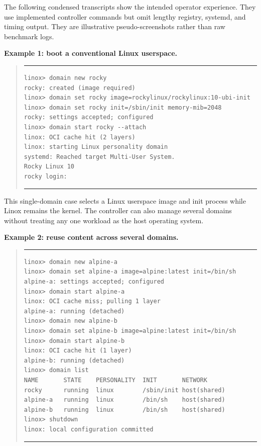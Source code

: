 \documentclass[11pt]{article}
\begin{document}
The following condensed transcripts show the intended operator experience.
They use implemented controller commands but omit lengthy registry, systemd,
and timing output. They are illustrative pseudo-screenshots rather than raw
benchmark logs.

\medskip
\begin{samepage}
\noindent\textbf{Example 1: boot a conventional Linux userspace.}\par\nopagebreak\smallskip
\begin{quote}\small\hrule\vspace{4pt}
\begin{verbatim}
linox> domain new rocky
rocky: created (image required)
linox> domain set rocky image=rockylinux/rockylinux:10-ubi-init
linox> domain set rocky init=/sbin/init memory-mib=2048
rocky: settings accepted; configured
linox> domain start rocky --attach
linox: OCI cache hit (2 layers)
linox: starting Linux personality domain
systemd: Reached target Multi-User System.
Rocky Linux 10
rocky login:
\end{verbatim}
\vspace{2pt}\hrule
\end{quote}
\end{samepage}
\medskip

This single-domain case selects a Linux userspace image and init process while
Linox remains the kernel. The controller can also manage several domains
without treating any one workload as the host operating system.

\medskip
\begin{samepage}
\noindent\textbf{Example 2: reuse content across several domains.}\par\nopagebreak\smallskip
\begin{quote}\small\hrule\vspace{4pt}
\begin{verbatim}
linox> domain new alpine-a
linox> domain set alpine-a image=alpine:latest init=/bin/sh
alpine-a: settings accepted; configured
linox> domain start alpine-a
linox: OCI cache miss; pulling 1 layer
alpine-a: running (detached)
linox> domain new alpine-b
linox> domain set alpine-b image=alpine:latest init=/bin/sh
linox> domain start alpine-b
linox: OCI cache hit (1 layer)
alpine-b: running (detached)
linox> domain list
NAME       STATE    PERSONALITY  INIT       NETWORK
rocky      running  linux        /sbin/init host(shared)
alpine-a   running  linux        /bin/sh    host(shared)
alpine-b   running  linux        /bin/sh    host(shared)
linox> shutdown
linox: local configuration committed
\end{verbatim}
\vspace{2pt}\hrule
\end{quote}
\end{samepage}
\medskip
\end{document}
